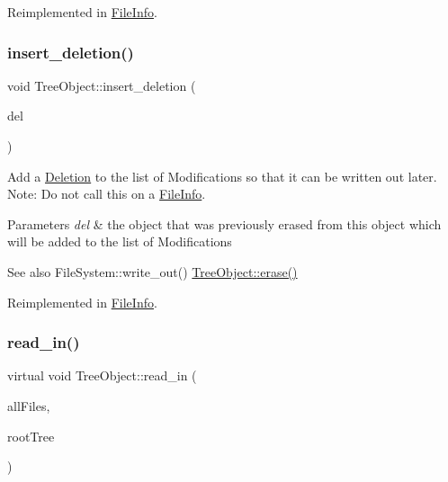 Reimplemented in \mbox{\hyperlink{class_file_info_a7f788f31521c535646eebfa9959bbb24}{File\+Info}}.

\mbox{\label{class_tree_object_afcc4b3928d2b77ff080aa229a9706215}} 
\subsubsection{\texorpdfstring{insert\+\_\+deletion()}{insert\_deletion()}}
{\footnotesize\ttfamily void Tree\+Object\+::insert\+\_\+deletion (\begin{DoxyParamCaption}\item[{\mbox{\hyperlink{class_tree_object}{Tree\+Object}} $\ast$}]{del }\end{DoxyParamCaption})\hspace{0.3cm}{\ttfamily [virtual]}}

Add a \mbox{\hyperlink{class_deletion}{Deletion}} to the list of Modifications so that it can be written out later. Note\+: Do not call this on a \mbox{\hyperlink{class_file_info}{File\+Info}}. 
\begin{DoxyParams}{Parameters}
{\em del} & the object that was previously erased from this object which will be added to the list of Modifications \\
\hline
\end{DoxyParams}
\begin{DoxySeeAlso}{See also}
File\+System\+::write\+\_\+out() \mbox{\hyperlink{class_tree_object_a453b5df2a9ef7c6faad259900d574ee2}{Tree\+Object\+::erase()}} 
\end{DoxySeeAlso}


Reimplemented in \mbox{\hyperlink{class_file_info_a278136b1d68f55dc56a4be807076fc0d}{File\+Info}}.

\mbox{\label{class_tree_object_a722eb00e6782626281afc8eff92840a4}} 
\subsubsection{\texorpdfstring{read\+\_\+in()}{read\_in()}}
{\footnotesize\ttfamily virtual void Tree\+Object\+::read\+\_\+in (\begin{DoxyParamCaption}\item[{unordered\+\_\+multimap$<$ string, \mbox{\hyperlink{class_file_info}{File\+Info}} $\ast$$>$ $\ast$}]{all\+Files,  }\item[{\mbox{\hyperlink{class_root_tree}{Root\+Tree}} $\ast$}]{root\+Tree }\end{DoxyParamCaption})\hspace{0.3cm}{\ttfamily [pure virtual]}}

